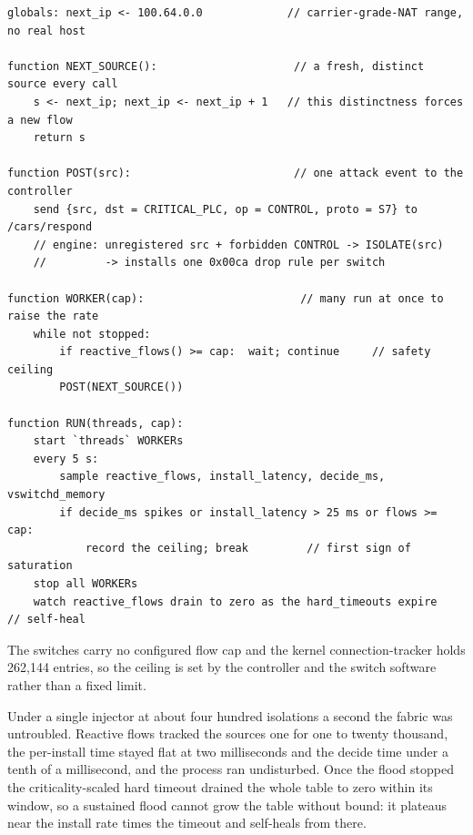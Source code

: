 \begin{lstlisting}[style=carspseudo,caption={The flow-table saturation harness (\texttt{flowtable\_stress.py}): a flood of distinct sources posted to the controller, each forcing one source-scoped isolate, sampled as the reactive table fills and then self-heals on timeout.},label={lst:flowtable}]
globals: next_ip <- 100.64.0.0             // carrier-grade-NAT range, no real host

function NEXT_SOURCE():                     // a fresh, distinct source every call
    s <- next_ip; next_ip <- next_ip + 1   // this distinctness forces a new flow
    return s

function POST(src):                         // one attack event to the controller
    send {src, dst = CRITICAL_PLC, op = CONTROL, proto = S7} to /cars/respond
    // engine: unregistered src + forbidden CONTROL -> ISOLATE(src)
    //         -> installs one 0x00ca drop rule per switch

function WORKER(cap):                        // many run at once to raise the rate
    while not stopped:
        if reactive_flows() >= cap:  wait; continue     // safety ceiling
        POST(NEXT_SOURCE())

function RUN(threads, cap):
    start `threads` WORKERs
    every 5 s:
        sample reactive_flows, install_latency, decide_ms, vswitchd_memory
        if decide_ms spikes or install_latency > 25 ms or flows >= cap:
            record the ceiling; break         // first sign of saturation
    stop all WORKERs
    watch reactive_flows drain to zero as the hard_timeouts expire   // self-heal
\end{lstlisting} The switches carry no configured flow cap and the kernel connection-tracker holds 262{,}144 entries, so the ceiling is set by the controller and the switch software rather than a fixed limit.

Under a single injector at about four hundred isolations a second the fabric was untroubled. Reactive flows tracked the sources one for one to twenty thousand, the per-install time stayed flat at two milliseconds and the decide time under a tenth of a millisecond, and the process ran undisturbed. Once the flood stopped the criticality-scaled hard timeout drained the whole table to zero within its window, so a sustained flood cannot grow the table without bound: it plateaus near the install rate times the timeout and self-heals from there.

